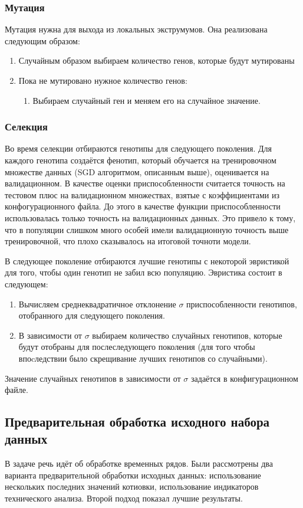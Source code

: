 \documentclass[a4paper,12pt]{article}
\begin{document}
\subsubsection{Мутация}
Мутация нужна для выхода из локальных экструмумов.
Она реализована следующим образом:
\begin{enumerate}
\item Случайным образом выбираем количество генов, которые будут мутированы
\item Пока не мутировано нужное количество генов:
\begin{enumerate}
\item Выбираем случайный ген и меняем его на случайное значение.
\end{enumerate}
\end{enumerate}

\subsubsection{Селекция}
Во время селекции отбираются генотипы для следующего поколения. Для каждого генотипа создаётся фенотип, который обучается на тренировочном множестве данных (SGD алгоритмом, описанным выше), оценивается на валидационном. В качестве оценки приспособленности считается точность на тестовом плюс на валидационном множествах, взятые с коэффициентами из конфогурационного файла. До этого в качестве функции приспособленности использовалась только точность на валидационных данных. Это привело к тому, что в популяции слишком много особей имели валидационную точность выше  тренировочной, что плохо сказывалось на итоговой точноти модели.

В следующее поколение отбираются лучшие генотипы с некоторой эвристикой для того, чтобы один генотип не забил всю популяцию. Эвристика состоит в следующем:
\begin{enumerate}
\item Вычисляем среднеквадратичное отклонение $\sigma$ приспособленности генотипов, отобранного для следующего поколения.
\item В зависимости от $\sigma$ выбираем количество случайных генотипов, которые будут отобраны для послеследующего поколения (для того чтобы впоcледствии было скрещивание лучших генотипов со случайными).
\end{enumerate}

Значение случайных генотипов в зависимости от $\sigma$ задаётся в конфигурационном файле.


\subsection{Предварительная обработка исходного набора данных}
В задаче речь идёт об обработке временных рядов. Были рассмотрены два варианта предварительной обработки исходных данных: использование нескольких последних значений котиовки, использование индикаторов технического анализа. Второй подход показал лучшие результаты.
\end{document}

